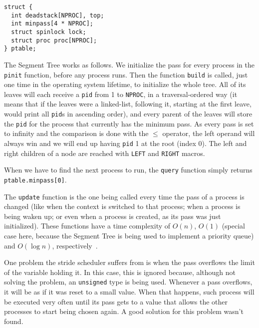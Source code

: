 \documentclass[12pt]{article}
\begin{document}
\begin{scriptsize}
\begin{verbatim}
struct {
  int deadstack[NPROC], top;
  int minpass[4 * NPROC];
  struct spinlock lock;
  struct proc proc[NPROC];
} ptable;
\end{verbatim}
\end{scriptsize}

The Segment Tree works as follows. We initialize the pass for every process in the \texttt{pinit} function, before any process runs. Then the function \texttt{build} is called, just one time in the operating system lifetime, to initialize the whole tree. All of its leaves will each receive a \texttt{pid} from 1 to \texttt{NPROC}, in a traversal-ordered way (it means that if the leaves were a linked-list, following it, starting at the first leave, would print all \texttt{pid}s in ascending order), and every parent of the leaves will store the \texttt{pid} for the process that currently has the minimum pass. As every pass is set to infinity and the comparison is done with the $\le$ operator, the left operand will always win and we will end up having \texttt{pid} 1 at the root (index 0). The left and right children of a node are reached with \texttt{LEFT} and \texttt{RIGHT} macros.

When we have to find the next process to run, the \texttt{query} function simply returns \texttt{ptable.minpass[0]}.

The \texttt{update} function is the one being called every time the pass of a process is changed (like when the context is switched to that process; when a process is being waken up; or even when a process is created, as its pass was just initialized). These functions have a time complexity of $O(n)$, $O(1)$ (special case here, because the Segment Tree is being used to implement a priority queue) and $O(\log n)$, respectively~\cite{halim:13}.

One problem the stride scheduler suffers from is when the pass overflows the limit of the variable holding it. In this case, this is ignored because, although not solving the problem, an \texttt{unsigned} type is being used. Whenever a pass overflows, it will be as if it was reset to a small value. When that happens, such process will be executed very often until its pass gets to a value that allows the other processes to start being chosen again. A good solution for this problem wasn't found.
\end{document}
